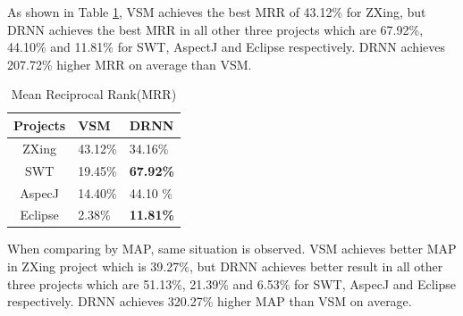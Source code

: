 As shown in Table \ref{performance_MRR}, VSM achieves the best MRR of 43.12\% for ZXing, but DRNN achieves the best MRR in all other three projects which are 67.92\%, 44.10\% and 11.81\% for SWT, AspectJ and Eclipse respectively. 
DRNN achieves 207.72\% higher MRR on average than VSM.
%
% 		
% 			
% 			
% 			
% 			

 \begin{table}[h]
 	\begin{center}
 		\caption{Mean Reciprocal Rank(MRR)}
 		\label{performance_MRR}
 		
 		\begin{tabular}{c|l|l} %
 			\textbf{Projects} & \textbf{VSM} & \textbf{DRNN} \\
 			\hline\hline
 			ZXing& 43.12\%&34.16\%  \\
 			
 			SWT & 19.45\% & \textbf{67.92\%}  \\
 			
 			AspecJ &14.40\%  & 44.10 \% \\
 			
 			Eclipse &2.38\% & \textbf{11.81\%} \\
 			
 		\end{tabular}
 	\end{center}
 \end{table}
When comparing by MAP, same situation is observed. 
VSM achieves better MAP in ZXing project which is 39.27\%, but DRNN achieves better result in all other three projects which are 51.13\%, 21.39\% and 6.53\% for SWT, AspecJ and Eclipse respectively. 
DRNN achieves 320.27\% higher MAP than VSM on average. 

